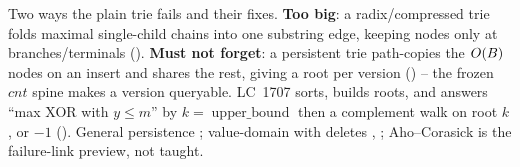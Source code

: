 \begin{recallbox}
Two ways the plain trie fails and their fixes. \textbf{Too big}: a radix/compressed trie folds maximal
single-child chains into one substring edge, keeping nodes only at branches/terminals ().
\textbf{Must not forget}: a persistent trie path-copies the $O(B)$ nodes on an insert and shares the
rest, giving a root per version () -- the frozen $\mathit{cnt}$ spine makes a version
queryable. LC~1707 sorts, builds roots, and answers ``max XOR with $y\le m$'' by
$k=\operatorname{upper\_bound}$ then a complement walk on root $k$, or $-1$ ().
General persistence ; value-domain with deletes , ; Aho--Corasick is the
failure-link preview, not taught.
\end{recallbox}
